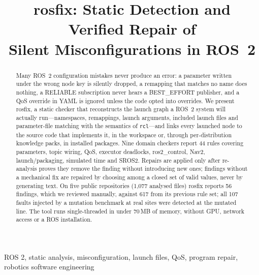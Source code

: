 ﻿\documentclass[conference]{IEEEtran}
\newcommand{\tool}{\textsf{rosfix}}
\newcommand{\code}[1]{\texttt{#1}}
\begin{document}
\title{\tool: Static Detection and Verified Repair of\\Silent Misconfigurations in ROS~2}

\author{
}

\maketitle

\begin{abstract}
Many ROS~2 configuration mistakes never produce an error: a parameter written under the
wrong node key is silently dropped, a remapping that matches no name does nothing, a
RELIABLE subscription never hears a BEST\_EFFORT publisher, and a QoS override in YAML is
ignored unless the code opted into overrides. We present \tool, a static checker that
reconstructs the launch graph a ROS~2 system will actually run---namespaces, remappings,
launch arguments, included launch files and parameter-file matching with the semantics of
\code{rcl}---and links every launched node to the source code that implements it, in the
workspace or, through per-distribution knowledge packs, in installed packages. Nine domain
checkers report 44 rules covering parameters, topic wiring, QoS, executor deadlocks,
ros2\_control, Nav2, launch/packaging, simulated time and SROS2. Repairs are applied only after
re-analysis proves they remove the finding without introducing new ones; findings without a
mechanical fix are repaired by choosing among a closed set of valid values, never by
generating text. On five public repositories (1{,}077 analysed files) \tool{} reports 56
findings, which we reviewed manually, against 617 from its previous rule set; all 107 faults
injected by a mutation benchmark at real sites were detected at the mutated line. The tool
runs single-threaded in under 70\,MB of memory, without GPU, network access or a ROS
installation.
\end{abstract}

\begin{IEEEkeywords}
ROS 2, static analysis, misconfiguration, launch files, QoS, program repair, robotics software engineering
\end{IEEEkeywords}

\end{document}
